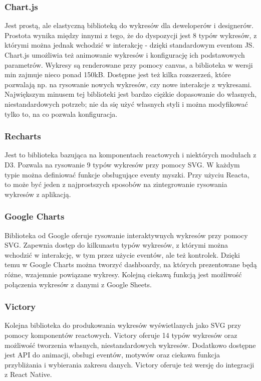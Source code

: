 \documentclass[12pt,a4paper]{article} %
\begin{document}
    \subsubsection{Chart.js}
        Jest prostą, ale elastyczną biblioteką do wykresów dla deweloperów i designerów. Prostota wynika między innymi z tego, że do dyspozycji jest 8 typów wykresów, z którymi można jednak wchodzić w interakcję - dzięki standardowym eventom JS.
        Chart.js umożliwia też animowanie wykresów i konfigurację ich podstawowych parametrów. Wykresy są renderowane przy pomocy canvas, a biblioteka w wersji min zajmuje nieco ponad 150kB. Dostępne jest też kilka rozszerzeń, które pozwalają np. na rysowanie nowych wykresów, czy nowe interakcje z wykresami. Największym minusem tej biblioteki jest bardzo ciężkie dopasowanie do własnych, niestandardowych potrzeb; nie da się użyć własnych styli i można modyfikować tylko to, na co pozwala konfiguracja.

        
    \subsubsection{Recharts}
        Jest to biblioteka bazująca na komponentach reactowych i niektórych modułach z D3. Pozwala na rysowanie 9 typów wykresów przy pomocy SVG. W każdym typie można definiować funkcje obsługujące eventy myszki. Przy użyciu Reacta, to może być jeden z najprostszych sposobów na zintegrowanie rysowania wykresów z aplikacją.
        
    \subsubsection{Google Charts}
        Biblioteka od Google oferuje rysowanie interaktywnych wykresów przy pomocy SVG. Zapewnia dostęp do kilkunastu typów wykresów, z którymi można wchodzić w interakcję, w tym przez użycie eventów, ale też kontrolek. Dzięki temu w Google Charts można tworzyć dashboardy, na których prezentowane będą różne, wzajemnie powiązane wykresy. Kolejną ciekawą funkcją jest możliwość połączenia wykresów z danymi z Google Sheets.
        
    \subsubsection{Victory}
        Kolejna biblioteka do produkowania wykresów wyświetlanych jako SVG przy pomocy komponentów reactowych. Victory oferuje 14 typów wykresów oraz możliwość tworzenia własnych, niestandardowych wykresów. Dodatkowo dostępne jest API do animacji, obsługi eventów, motywów oraz ciekawa funkcja przybliżania i wybierania zakresu danych. Victory oferuje też wersję do integracji z React Native.
    
\end{document}
